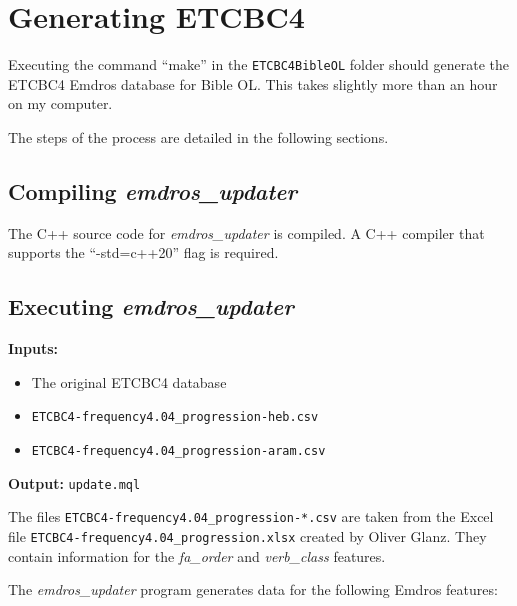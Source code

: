 \documentclass[11pt,oneside,a4paper,article]{memoir}
\begin{document}
\vspace{1ex}




\chapter{Generating ETCBC4}

Executing the command ``make'' in the \texttt{ETCBC4BibleOL} folder should generate the ETCBC4
Emdros database for Bible OL. This takes slightly more than an hour on my computer.

The steps of the process are detailed in the following sections.

\section{Compiling \emph{emdros\_updater}}

The C++ source code for \emph{emdros\_updater} is compiled. A C++ compiler that supports the
``-std=c++20'' flag is required.

\section{Executing \emph{emdros\_updater}}

\noindent \textbf{Inputs:}
\begin{itemize}
\item The original ETCBC4 database
\item \texttt{ETCBC4-frequency4.04\_progression-heb.csv}
\item \texttt{ETCBC4-frequency4.04\_progression-aram.csv}
\end{itemize}

\noindent \textbf{Output:} \texttt{update.mql}

\vspace{1ex}

The files \texttt{ETCBC4-frequency4.04\_progression-*.csv} are taken from the Excel file
\texttt{ETCBC4-frequency4.04\_progression.xlsx} created by Oliver Glanz. They contain information
for the \emph{fa\_order} and \emph{verb\_class} features.

The \emph{emdros\_updater} program generates data for the following Emdros features:
\end{document}
